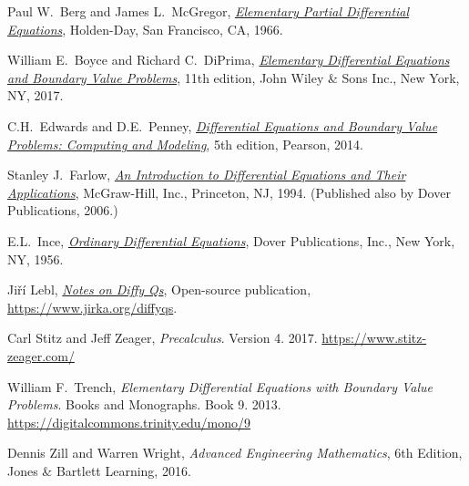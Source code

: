 \documentclass[12pt]{book}
\begin{document}
\begin{thebibliography}{MM}


\label{furtherreading:chapter}

 Paul W.\ Berg and James L.\ McGregor, 
 \emph{\href{https://books.google.com/books?id=EfJQAAAAMAAJ}{Elementary
Partial Differential Equations}}, 
 Holden-Day,
 San Francisco, CA\@,
 1966.

 William E.\ Boyce and
 Richard C.\ DiPrima,
 \emph{\href{https://books.google.com/books?id=nYWcQgAACAAJ}{Elementary
Differential Equations and Boundary Value Problems}},
 11th edition,
 John Wiley \& Sons Inc.,
 New York, NY\@, 2017.

 C.H.\ Edwards and D.E.\ Penney,
 \emph{\href{https://books.google.com/books?id=wuWvoAEACAAJ}{Differential
Equations and Boundary Value Problems: Computing and Modeling}},
 5th edition,
 Pearson,
 2014.

 Stanley J.\ Farlow,
 \emph{\href{https://books.google.com/books?id=_ozWAAAAMAAJ}{An Introduction
to Differential Equations and Their Applications}},
 McGraw-Hill, Inc.,
 Princeton, NJ\@,
 1994.  (Published also by Dover Publications, 2006.)

 E.L.\ Ince,
 \emph{\href{https://books.google.com/books?id=uYz-pqUD75gC}{Ordinary
Differential Equations}},
 Dover Publications, Inc.,
 New York, NY\@,
 1956.

Ji{\v r}\'{i} Lebl,
\href{https://www.jirka.org/diffyqs}{\emph{Notes on Diffy Qs}}, 
Open-source publication,
\url{https://www.jirka.org/diffyqs}.

Carl Stitz and Jeff Zeager,
\emph{Precalculus}. Version 4. 2017.
\url{https://www.stitz-zeager.com/}

 William F.\ Trench,
 \emph{Elementary Differential Equations with Boundary Value
Problems}. Books and Monographs. Book 9.  2013.
\url{https://digitalcommons.trinity.edu/mono/9}

Dennis Zill and Warren Wright,
\emph{Advanced Engineering Mathematics}, 6th Edition, Jones \& Bartlett Learning, 2016.

\end{thebibliography}

\printanswers

\diffyindex
\end{document}
